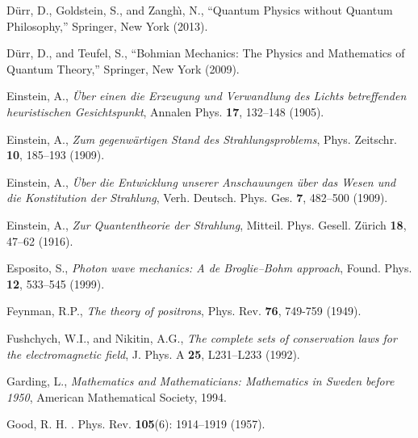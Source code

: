 \documentclass[11pt]{article}
\theoremstyle{definition}
\numberwithin{equation}{section}
\begin{document}
\begin{thebibliography}{[KTZ2020]}
\newblock D\"urr, D., Goldstein, S., and Zangh\`{\i}, N.,
\newblock ``{Quantum Physics without Quantum Philosophy},''
\newblock Springer, New York (2013).\vspace{-4pt}

D\"urr, D.,
and
Teufel, S.,
       ``{Bohmian Mechanics: The Physics and Mathematics of Quantum Theory},''
       Springer, New York (2009).\vspace{-4pt}

  Einstein, A.,
  {\it \"Uber einen die Erzeugung und Verwandlung des Lichts betreffenden heuristischen Gesichtspunkt},
 Annalen Phys. \textbf{17}, 132--148 (1905).\vspace{-4pt}

  Einstein, A.,
 {\it Zum gegenw\"artigen Stand des Strahlungsproblems},
 Phys. Zeitschr. \textbf{10}, 185--193 (1909).\vspace{-4pt}

  Einstein, A.,
  {\it \"Uber die Entwicklung unserer Anschauungen \"uber das Wesen und die Konstitution der Strahlung},
 Verh. Deutsch. Phys. Ges. \textbf{7}, 482--500 (1909).\vspace{-4pt}

  Einstein, A.,
  {\it Zur Quantentheorie der Strahlung},
 Mitteil. Phys. Gesell. Z\"urich \textbf{18}, 47--62 (1916).\vspace{-4pt}

  Esposito, S., 
  \textit{Photon wave mechanics: A de Broglie--Bohm approach}, 
  Found. Phys. \textbf{12}, 533--545 (1999).

        Feynman, R.P.,
               \textit{The theory of positrons},
        Phys. Rev. \textbf{76}, 749-759 (1949).\vspace{-4pt}

  Fushchych, W.I., 
  and
  Nikitin, A.G.,
  \textit{The complete sets of conservation laws for the electromagnetic field},
  J. Phys. A \textbf{25}, L231--L233 (1992).\vspace{-4pt}

Garding, L.,
\textit{Mathematics and Mathematicians: Mathematics in Sweden before 1950},
American Mathematical Society, 1994.

 Good, R. H.
 .
 \newblock Phys. Rev. {\bf 105}(6): 1914--1919 (1957).\vspace{-4pt}


\end{thebibliography}
\end{document}

